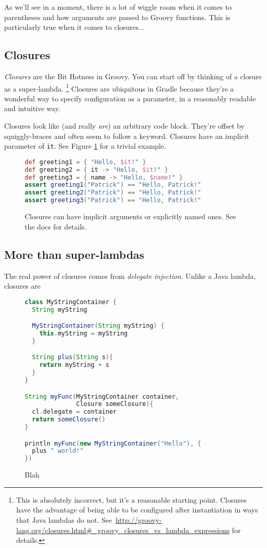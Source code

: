 \documentclass[]{article}
\theoremstyle{definition}
\begin{document}
As we'll see in a moment, there is a lot of wiggle room when it comes to parentheses and how arguments are passed to Groovy functions.
This is particularly true when it comes to closures...

\subsection{Closures}
\textit{Closures} are the Bit Hotness in Groovy.
You can start off by thinking of a closure as a super-lambda.%
\footnote{This is absolutely incorrect, but it's a reasonable starting point.
  Closures have the advantage of being able to be configured after instantiation in ways that Java lambdas do not.
  See\ \url{http://groovy-lang.org/closures.html\#\_groovy_closures_vs_lambda_expressions} for details.}
Closures are ubiquitous in Gradle because they're a wonderful way to specify configuration as a parameter, in a reasonably readable and intuitive way.

Closures look like (and really \emph{are}) an arbitrary code block.
They're offset by squiggly-braces and often seem to follow a keyword.
Closures have an implicit parameter of \texttt{it}.
See Figure \ref{fig:equiv} for a trivial example.

\begin{figure}[h]
  \centering
  \begin{lstlisting}[language=Groovy]
def greeting1 = { "Hello, $it!" } 
def greeting2 = { it -> "Hello, $it!" }
def greeting3 = { name -> "Hello, $name!" }
assert greeting1("Patrick") == "Hello, Patrick!"
assert greeting2("Patrick") == "Hello, Patrick!"
assert greeting3("Patrick") == "Hello, Patrick!"
  \end{lstlisting}
\caption{Closures can have implicit arguments or explicitly named ones.  See the docs for details.} %
\label{fig:equiv}
\end{figure}

\subsection{More than super-lambdas}

The real power of closures comes from \emph{delegate injection}.
Unlike a Java lambda, closures are

\begin{figure}[h]
  \centering
  \begin{lstlisting}[language=Groovy]
class MyStringContainer {
  String myString

  MyStringContainer(String myString) {
    this.myString = myString
  }

  String plus(String s){
    return myString + s
  }
}

String myFunc(MyStringContainer container,
              Closure someClosure){
  cl.delegate = container
  return someClosure()
}

println myFunc(new MyStringContainer("Hello"), {
  plus " world!"
})
  \end{lstlisting}
  \caption{Blah}
  \label{fig:delegation}
\end{figure}
\end{document}
